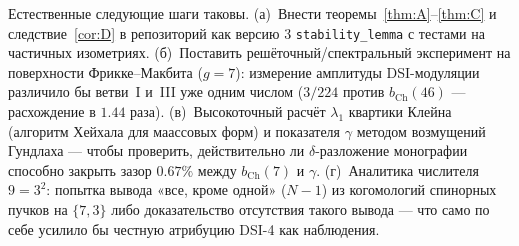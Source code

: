 \documentclass[11pt,a4paper]{article}
\theoremstyle{definition}
\theoremstyle{remark}
\begin{document}
Естественные следующие шаги таковы. (а)~Внести теоремы~\ref{thm:A}--\ref{thm:C}
и следствие~\ref{cor:D} в репозиторий как версию 3 \texttt{stability\_lemma}
с тестами на частичных изометриях. (б)~Поставить решёточный/спектральный
эксперимент на поверхности Фрикке--Макбита ($g = 7$): измерение амплитуды
DSI-модуляции различило бы ветви~I и~III уже одним числом ($3/224$ против
$b_{\mathrm{Ch}}(46)$ --- расхождение в $1.44$ раза). (в)~Высокоточный расчёт
$\lambda_1$ квартики Клейна (алгоритм Хейхала для маассовых форм) и показателя
$\gamma$ методом возмущений Гундлаха --- чтобы проверить, действительно ли
$\delta$-разложение монографии способно закрыть зазор $0.67\%$ между
$b_{\mathrm{Ch}}(7)$ и $\gamma$. (г)~Аналитика числителя $9 = 3^2$: попытка
вывода «все, кроме одной» ($N - 1$) из когомологий спинорных пучков на
$\{7,3\}$ либо доказательство отсутствия такого вывода --- что само по себе
усилило бы честную атрибуцию DSI-4 как наблюдения.
\end{document}
